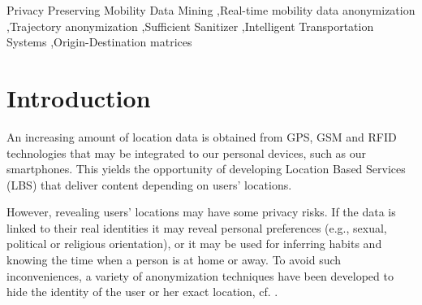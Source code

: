 \documentclass[times,twocolumn,final,authoryear]{elsarticle}
\begin{document}
\begin{frontmatter}
\begin{abstract}
\end{abstract}




\begin{keyword}
\KWD Privacy Preserving Mobility Data Mining \sep Real-time mobility data anonymization \sep Trajectory anonymization \sep Sufficient Sanitizer \sep Intelligent Transportation Systems \sep Origin-Destination matrices 
\end{keyword}

\end{frontmatter}


\section{Introduction}

An increasing amount of location data is obtained from GPS, GSM and RFID technologies that may be integrated to our personal devices, such as our smartphones. This yields the opportunity of developing Location Based Services (LBS) that deliver content depending on users' locations.

However, revealing users' locations may have some privacy risks. If the data is linked to their real identities it may reveal personal preferences (e.g., sexual, political or religious orientation), or it may be used for inferring habits and knowing the time when a person is at home or away.
To avoid such inconveniences, a variety of anonymization techniques have been developed to hide the identity of the user or her exact location, cf. \cite{Terrovitis:2011}.
\end{document}
